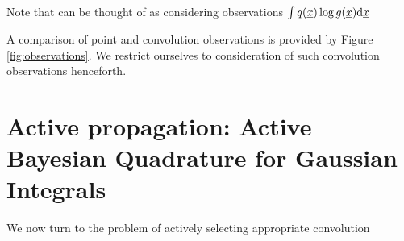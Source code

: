 \documentclass[twoside]{article}
\begin{document}
Note that \vb can be thought of as considering observations $\int q(\underline{\smash{x}}) \log g(\underline{\smash{x}}) \mathrm{d}\underline{\smash{x}}$



A comparison of point and convolution observations is provided by Figure \ref{fig:observations}. 
We restrict ourselves to consideration of such convolution observations henceforth.


\section{Active propagation: Active Bayesian Quadrature for Gaussian Integrals}
\label{sec:active}

We now turn to the problem of actively selecting appropriate convolution 



\end{document}
